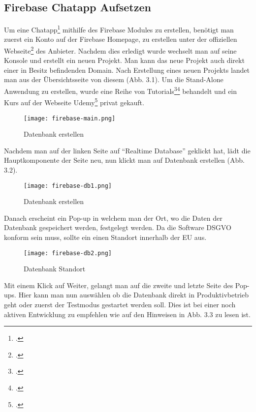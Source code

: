 \subsection{Firebase Chatapp Aufsetzen}
Um eine Chatapp\footcite{Chatapp-Beispiel} mithilfe des Firebase Modules zu erstellen, benötigt man zuerst ein Konto auf der Firebase Homepage, zu erstellen unter der offiziellen Webseite\footcite{firebase-site} des Anbieter.
Nachdem dies erledigt wurde wechselt man auf seine Konsole und erstellt ein neuen Projekt. Man kann das neue Projekt auch direkt einer in Besitz befindenden Domain. Nach Erstellung eines neuen Projekts landet man aus der Übersichtsseite
von diesem (Abb. 3.1). Um die Stand-Alone Anwendung zu erstellen, wurde eine Reihe von Tutorials\footcite{firebase-yt-tut}\footcite{firebase-tut1} behandelt und ein Kurs auf der Webseite Udemy\footcite{udemy-course} privat gekauft.
\begin{center}
    \begin{figure}[H]
        \centering
        \texttt{[image: firebase-main.png]}
        \caption{Datenbank erstellen}
    \end{figure}
\end{center}
Nachdem man auf der linken Seite auf "`Realtime Database"' geklickt hat, lädt die Hauptkomponente der Seite neu, nun klickt man auf Datenbank erstellen (Abb. 3.2).
\begin{center}
    \begin{figure}[H]
        \centering
        \texttt{[image: firebase-db1.png]}
        \caption{Datenbank erstellen}
    \end{figure}
\end{center}
Danach erscheint ein Pop-up in welchem man der Ort, wo die Daten der Datenbank gespeichert werden, festgelegt werden. Da die Software DSGVO konform sein muss, sollte ein einen Standort innerhalb der EU aus.
\begin{center}
    \begin{figure}[H]
        \centering
        \texttt{[image: firebase-db2.png]}
        \caption{Datenbank Standort}
    \end{figure}
\end{center}
Mit einem Klick auf Weiter, gelangt man auf die zweite und letzte Seite des Pop-ups. Hier kann man nun auswählen ob die Datenbank direkt in Produktivbetrieb geht oder zuerst der Testmodus gestartet werden soll. Dies ist bei einer
noch aktiven Entwicklung zu empfehlen wie auf den Hinweisen in Abb. 3.3 zu lesen ist.
